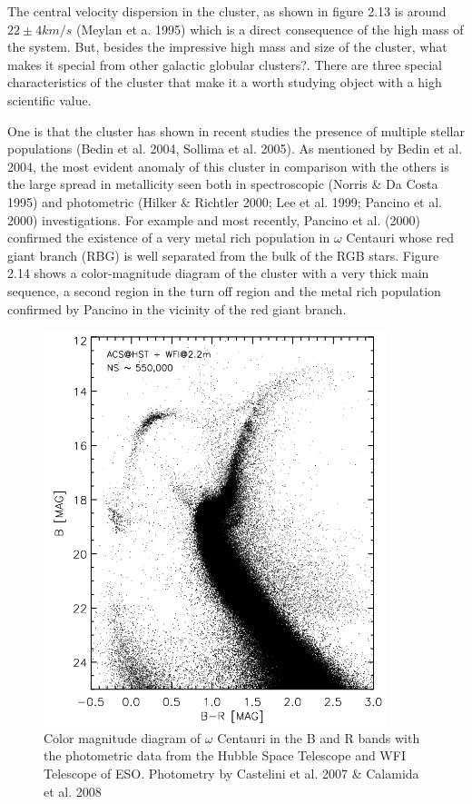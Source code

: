 The central velocity dispersion in the cluster, as shown in figure 2.13 is around $22 \pm 4km/s$ (Meylan et a. 1995) which is a direct consequence of the high mass of the system. But, besides the impressive high mass and size of the cluster, what makes it special from other galactic globular clusters?. There are three special characteristics of the cluster that make it a worth studying object with a high scientific value.

One is that the cluster has shown in recent studies the presence of multiple stellar populations (Bedin et al. 2004, Sollima et al. 2005). As mentioned by Bedin et al. 2004, the most evident anomaly of this cluster in comparison with the others is the large spread in metallicity seen both in spectroscopic (Norris \& Da Costa 1995) and photometric (Hilker \& Richtler 2000; Lee et al. 1999; Pancino et al. 2000) investigations. For example and most recently, Pancino et al. (2000) confirmed the existence of a very metal rich population in $\omega$ Centauri whose red giant branch (RBG) is well separated from the bulk of the RGB stars. Figure 2.14 shows a color-magnitude diagram of the cluster with a very thick main sequence, a second region in the turn off region and the metal rich population confirmed by Pancino in the vicinity of the red giant branch.

\begin{figure}[H]
\centering
\includegraphics[width=10cm]{images/ngc5139_2.jpg}
\caption[Color magnitude diagram of Omega Centauri]{Color magnitude diagram of $\omega$ Centauri in the B and R bands with the photometric data from the Hubble Space Telescope and WFI Telescope of ESO. Photometry by Castelini et al. 2007 \& Calamida et al. 2008}
\end{figure}

